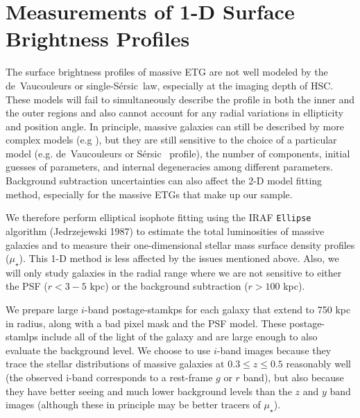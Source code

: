 \documentclass[a4paper,fleqn,usenatbib]{mnras}
\def\ser{{S\'{e}rsic\ }}
\def\mden{{$\mu_{\star}$}}
\begin{document}
\section{Measurements of 1-D Surface Brightness Profiles}
    \label{sec:ellipse}
    
    The surface brightness profiles of massive ETG are not well modeled by the 
    de~Vaucouleurs or single-\ser law, especially at the imaging depth of HSC.
    These models will fail to simultaneously describe the profile in both the inner 
    and the outer regions and also cannot account for any radial variations in 
    ellipticity and position angle. 
    In principle, massive galaxies can still be described by more complex 
    models (e.g \citealt{Huang2013a, Huang2013b, Oh2017}), but they are still 
    sensitive to the choice of a particular model (e.g. de~Vaucouleurs or \ser{} profile), 
    the number of components, initial guesses of parameters, and internal 
    degeneracies among different parameters. 
    Background subtraction uncertainties can also affect the 2-D model fitting method, especially for the massive ETGs that make up our sample. 
    
    
    We therefore perform elliptical isophote fitting using the IRAF \texttt{Ellipse} 
    algorithm (Jedrzejewski 1987) to estimate the total luminosities of massive 
    galaxies and to measure their one-dimensional stellar mass surface 
    density profiles (\mden{}). 
    This 1-D method is less affected by the issues mentioned above. 
    Also, we will only study galaxies in the radial range where we are not 
    sensitive to either the PSF ($r<3-5$ kpc) or the background subtraction 
    ($r>100$ kpc). 
        
    We prepare large $i$-band postage-stamkps for each galaxy that extend to 750 kpc in 
    radius, along with a bad pixel mask and the PSF model. 
    These postage-stamlps include all of the light of the galaxy and are large enough to 
    also evaluate the background level. 
    We choose to use $i$-band images because they trace the stellar distributions of 
    massive galaxies at $0.3 \leq z \leq 0.5$ reasonably well 
    (the observed i-band corresponds to a rest-frame $g$ or $r$ band), but also 
    because they have better seeing and much lower background levels than the $z$ 
    and $y$ band images (although these in principle may be better tracers of 
    \mden{}). 
    
\end{document}
